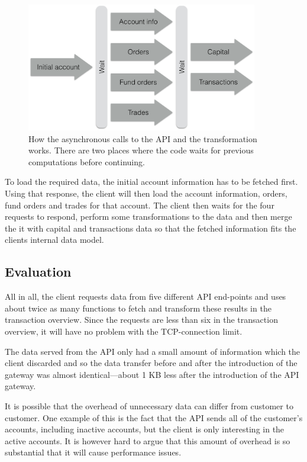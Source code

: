 \documentclass{cslthse-msc}
\begin{document}
\begin{figure}[H]
  \centering
    \begin{center}
      \includegraphics[width=0.9\textwidth]{images/bank_overview.png}
    \end{center}
  \caption{How the asynchronous calls to the API and the transformation works. There are two places where the code waits for previous computations before continuing.}
\end{figure}

To load the required data, the initial account information has to be fetched first. Using that response, the client will then load the account information, orders, fund orders and trades for that account. The client then waits for the four requests to respond, perform some transformations to the data and then merge the it with capital and transactions data so that the fetched information fits the clients internal data model.

\subsection{Evaluation}
All in all, the client requests data from five different API end-points and uses about twice as many functions to fetch and transform these results in the transaction overview. Since the requests are less than six in the transaction overview, it will have no problem with the TCP-connection limit.

The data served from the API only had a small amount of information which the client discarded and so the data transfer before and after the introduction of the gateway was almost identical---about 1 KB less after the introduction of the API gateway.

It is possible that the overhead of unnecessary data can differ from customer to customer. One example of this is the fact that the API sends all of the customer's accounts, including inactive accounts, but the client is only interesting in the active accounts. It is however hard to argue that this amount of overhead is so substantial that it will cause performance issues.
\end{document}
